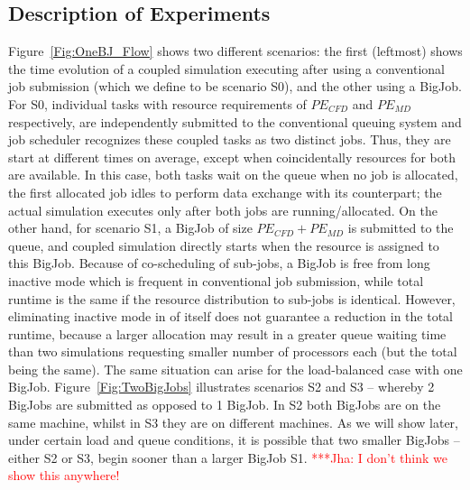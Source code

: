 \documentclass[conference,final]{IEEEtran}
\newcommand{\jhanote}[1]{ {\textcolor{red} { ***Jha: #1 }}}
\newcommand{\jhanote}[1]{}
\begin{document}

\subsection{Description of Experiments}

Figure~\ref{Fig:OneBJ_Flow} shows two different scenarios: the first
(leftmost) shows the time evolution of a coupled simulation executing
after using a conventional job submission (which we define to be
scenario S0), and the other using a BigJob. For S0, individual tasks
with resource requirements of $PE_{CFD}$ and $PE_{MD}$ respectively,
are independently submitted to the conventional queuing system and job
scheduler recognizes these coupled tasks as two distinct jobs. Thus,
they are start at different times on average, except when
coincidentally resources for both are available. In this case, both
tasks wait on the queue when no job is allocated, the first allocated
job idles to perform data exchange with its counterpart; the actual
simulation executes only after both jobs are running/allocated. On the
other hand, for scenario S1, a BigJob of size $PE_{CFD}+PE_{MD}$ is
submitted to the queue, and coupled simulation directly starts when
the resource is assigned to this BigJob. Because of co-scheduling of
sub-jobs, a BigJob is free from long inactive mode which is frequent
in conventional job submission, while total runtime is the same if the
resource distribution to sub-jobs is identical. However, eliminating
inactive mode in of itself does not guarantee a reduction in the total
runtime, because a larger allocation may result in a greater queue
waiting time than two simulations requesting smaller number of
processors each (but the total being the same). The same situation can
arise for the load-balanced case with one BigJob. %
Figure~\ref{Fig:TwoBigJobs} illustrates scenarios S2 and S3 -- whereby
2 BigJobs are submitted as opposed to 1 BigJob. In S2 both BigJobs are
on the same machine, whilst in S3 they are on different machines.  As
we will show later, under certain load and queue conditions, it is
possible that two smaller BigJobs -- either S2 or S3, begin sooner
than a larger BigJob S1. \jhanote{I don't think we show this
  anywhere!}
\end{document}
